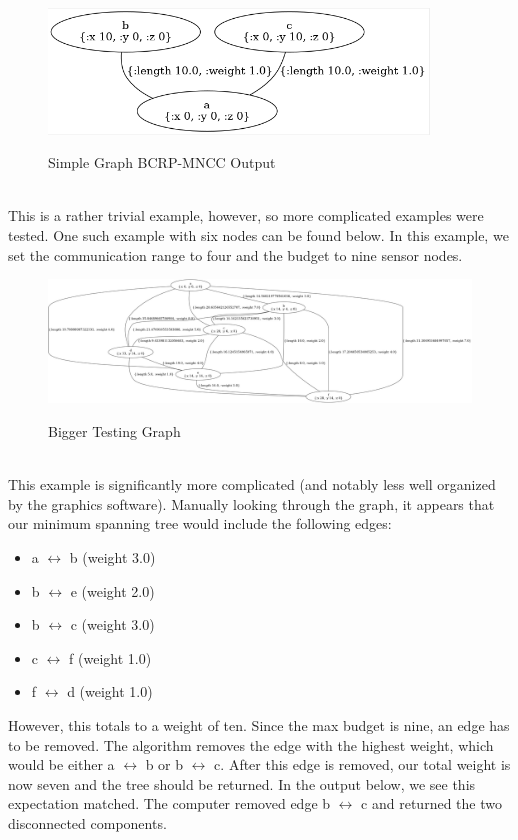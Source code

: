 \documentclass{article}
\begin{document}
\begin{figure}[h]
\centering
\includegraphics[width=0.9\textwidth]{examples/loc0_alg4.png}
\label{loc0_alg4}
\caption{Simple Graph BCRP-MNCC Output}
\end{figure}\\
This is a rather trivial example, however, so more complicated examples were tested.
One such example with six nodes can be found below.
In this example, we set the communication range to four and the budget to nine sensor nodes.
\begin{figure}[h]
\includegraphics[width=1.2\textwidth]{examples/loc3_graph.png}
\label{loc3_graph}
\caption{Bigger Testing Graph}
\end{figure}\\
This example is significantly more complicated (and notably less well organized by the graphics software).
Manually looking through the graph, it appears that our minimum spanning tree would include the following edges:

\begin{itemize}
  \item a $\longleftrightarrow$ b (weight 3.0)
  \item b $\longleftrightarrow$ e (weight 2.0)
  \item b $\longleftrightarrow$ c (weight 3.0)
  \item c $\longleftrightarrow$ f (weight 1.0)
  \item f $\longleftrightarrow$ d (weight 1.0)
\end{itemize}

However, this totals to a weight of ten.
Since the max budget is nine, an edge has to be removed.
The algorithm removes the edge with the highest weight, which would be either a $\longleftrightarrow$ b or b $\longleftrightarrow$ c.
After this edge is removed, our total weight is now seven and the tree should be returned.
In the output below, we see this expectation matched.
The computer removed edge b $\longleftrightarrow$ c and returned the two disconnected components.
\end{document}
